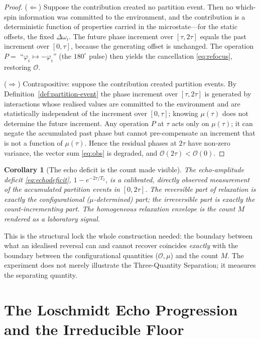 \documentclass[11pt,a4paper]{article}
\theoremstyle{thmstyle}
\newtheorem{corollary}[theorem]{Corollary}
\theoremstyle{definition}
\theoremstyle{remark}
\newcommand{\Ttwo}{T_{2}}
\newcommand{\Count}{M}
\newcommand{\Obs}{\mathcal{O}}
\newcommand{\Mic}{\mu}
\begin{document}
\begin{proof}
($\Leftarrow$) Suppose the contribution created no partition event. Then
no which-spin information was committed to the environment, and the
contribution is a deterministic function of properties carried in the
microstate---for the static offsets, the fixed $\Delta\omega_{i}$. The
future phase increment over $[\tau,2\tau]$ equals the past increment over
$[0,\tau]$, because the generating offset is unchanged. The operation
$P=$ ``$\varphi_{i}\mapsto-\varphi_{i}$'' (the $180^{\circ}$ pulse) then
yields the cancellation \eqref{eq:refocus}, restoring $\Obs$.

($\Rightarrow$) Contrapositive: suppose the contribution created
partition events. By Definition~\ref{def:partition-event} the phase
increment over $[\tau,2\tau]$ is generated by interactions whose realised
values are committed to the environment and are statistically independent
of the increment over $[0,\tau]$; knowing $\Mic(\tau)$ does not determine
the future increment. Any operation $P$ at $\tau$ acts only on
$\Mic(\tau)$; it can negate the accumulated past phase but cannot
pre-compensate an increment that is not a function of $\Mic(\tau)$.
Hence the residual phases at $2\tau$ have non-zero variance, the vector
sum \eqref{eq:obs} is degraded, and $\Obs(2\tau)<\Obs(0)$.
\end{proof}

\begin{corollary}[The echo deficit is the count made visible]
\label{cor:deficit}
The echo-amplitude deficit \eqref{eq:echodeficit},
$1-e^{-2\tau/\Ttwo}$, is a calibrated, directly observed measurement of
the accumulated partition events in $[0,2\tau]$. The reversible part of
relaxation is exactly the configurational ($\Mic$-determined) part; the
irreversible part is exactly the count-incrementing part. The
homogeneous relaxation envelope is the count $\Count$ rendered as a
laboratory signal.
\end{corollary}

This is the structural lock the whole construction needed: the boundary
between what an idealised reversal can and cannot recover coincides
\emph{exactly} with the boundary between the configurational quantities
($\Obs,\Mic$) and the count $\Count$. The experiment does not merely
illustrate the Three-Quantity Separation; it measures the separating
quantity.

\section{The Loschmidt Echo Progression and the Irreducible Floor}
\label{sec:progression}
\end{document}
